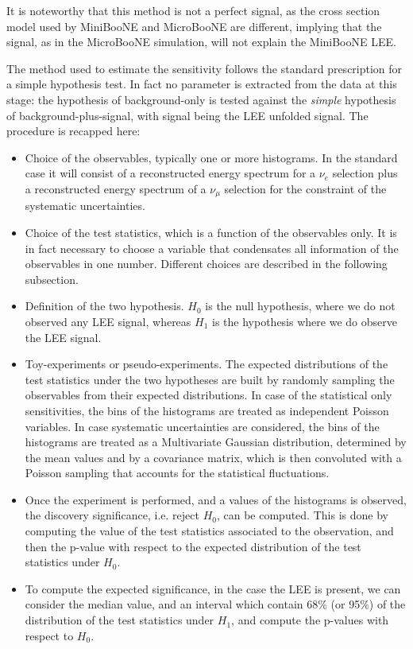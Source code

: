 \documentclass[a4paper]{article}
\newcommand{\nue}{$\nu_e$ }
\newcommand{\numu}{$\nu_{\mu}$ }
\begin{document}
It is noteworthy that this method is not a perfect signal, as the cross section model used by MiniBooNE and MicroBooNE are different, implying that the signal, as in the MicroBooNE simulation, will not explain the MiniBooNE LEE.

The method used to estimate the sensitivity follows the standard prescription for a simple hypothesis test.
In fact no parameter is extracted from the data at this stage: the hypothesis of background-only is tested against the \textit{simple} hypothesis of background-plus-signal, with signal being the LEE unfolded signal.
The procedure is recapped here:
\begin{itemize}
    \item Choice of the observables, typically one or more histograms. In the standard case it will consist of a reconstructed energy spectrum for a \nue selection plus a reconstructed energy spectrum of a \numu selection for the constraint of the systematic uncertainties.
    \item Choice of the test statistics, which is a function of the observables only. It is in fact necessary to choose a variable that condensates all information of the observables in one number. Different choices are described in the following subsection.
    \item Definition of the two hypothesis. $H_0$ is the null hypothesis, where we do not observed any LEE signal, whereas $H_1$ is the hypothesis where we do observe the LEE signal.
    \item Toy-experiments or pseudo-experiments. The expected distributions of the test statistics under the two hypotheses are built by randomly sampling the observables from their expected distributions. In case of the statistical only sensitivities, the bins of the histograms are treated as independent Poisson variables. In case systematic uncertainties are considered, the bins of the histograms are treated as a Multivariate Gaussian distribution, determined by the mean values and by a covariance matrix, which is then convoluted with a Poisson sampling that accounts for the statistical fluctuations.
    \item Once the experiment is performed, and a values of the histograms is observed, the discovery significance, i.e. reject $H_0$, can be computed. This is done by computing the value of the test statistics associated to the observation, and then the p-value with respect to the expected distribution of the test statistics under $H_0$.
    \item To compute the expected significance, in the case the LEE is present, we can consider the median value, and an interval which contain 68\% (or 95\%) of the distribution of the test statistics under $H_1$, and compute the p-values with respect to $H_0$.
\end{itemize}
\end{document}
